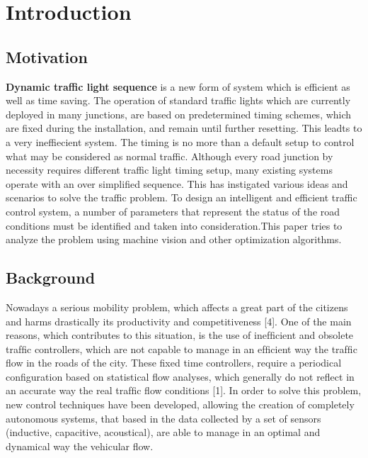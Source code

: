\documentclass{SureshLimkar}
\begin{document}
\maketitlepage %

\newpage

\makecertipage %

\newpage

\makeackpage %

\newpage

\makeabstrpage %

\tableofcontents

\listoffigures

\listoftables


\chapter{Introduction}
\section{Motivation}
\hspace {0.5 in}\textbf{Dynamic traffic light sequence} is a new form of system which is efficient as well as time saving. The operation of standard traffic lights which are currently deployed in many junctions, are based on predetermined timing schemes, which are fixed during the installation, and remain until further resetting. This leadts to a very ineffiecient system. The
timing is no more than a default setup to control what may be considered as normal traffic. Although every road junction by necessity requires different traffic light timing setup, many existing systems operate with an over simplified sequence. This has instigated various ideas and scenarios to solve the traffic problem. To design an intelligent and efficient traffic control system, a number of parameters that represent the status of the road conditions must be identified and taken into consideration.This paper tries to analyze the problem using machine vision and other optimization algorithms.

\section{Background}

\hspace {0.5 in}Nowadays a serious mobility
problem, which affects a great part of the citizens and
harms drastically its productivity and competitiveness [4]. One
of the main reasons, which contributes to this situation, is
the use of inefﬁcient and obsolete trafﬁc controllers, which
are not capable to manage in an efﬁcient way the trafﬁc ﬂow
in the roads of the city. These ﬁxed time controllers, require
a periodical conﬁguration based on statistical ﬂow analyses,
which generally do not reﬂect in an accurate way the real
trafﬁc ﬂow conditions [1].
In order to solve this problem, new control techniques
have been developed, allowing the creation of completely
autonomous systems, that based in the data collected by a
set of sensors (inductive, capacitive, acoustical), are able to
manage in an optimal and dynamical way the vehicular ﬂow.
\end{document}
